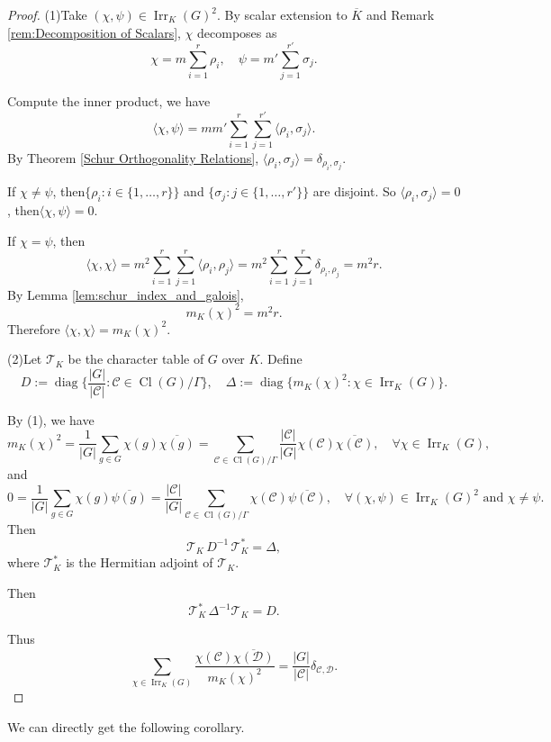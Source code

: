 \begin{proof}
(1)Take \((\chi,\psi) \in \operatorname{Irr}_K(G)^2\). By scalar extension to \(\overline K\) and Remark \ref{rem:Decomposition of Scalars}, \(\chi\) decomposes as
\[
\chi = m \sum_{i=1}^r \rho_i,\quad \psi = m' \sum_{j=1}^{r'} \sigma_j.
\]

Compute the inner product, we have
\[
\langle \chi, \psi \rangle
= m m' \sum_{i=1}^r \sum_{j=1}^{r'} \langle \rho_i, \sigma_j \rangle.
\]
By Theorem \ref{Schur Orthogonality Relations}, \(\langle \rho_i, \sigma_j \rangle = \delta_{\rho_i, \sigma_j}\).

If \(\chi \neq \psi\), then$\{\rho_i:i\in\{1,\dots,r\}\}$ and $\{\sigma_j:j\in\{1,\dots,r'\}\}$ are disjoint. So $\langle \rho_i, \sigma_j \rangle=0$ , then\(\langle \chi, \psi \rangle = 0\).

If \(\chi = \psi\), then 
\[
\langle \chi, \chi \rangle =m^2\sum_{i=1}^r \sum_{j=1}^{r} \langle \rho_i, \rho_j \rangle =m^2\sum_{i=1}^r \sum_{j=1}^r \delta_{\rho_i, \rho_j}=m^2 r.
\]
By Lemma \ref{lem:schur_index_and_galois},
\[
m_K(\chi)^2 = m^2 r.
\]
Therefore \(\langle \chi, \chi \rangle = m_K(\chi)^2\). 

(2)Let \(\mathcal T_K\) be the character table of $G$ over $K$. Define\[D:=\operatorname{diag}\{\frac{|G|}{|\mathcal{C}|}:\mathcal C\in \operatorname{Cl}(G)/\Gamma \},\quad \Delta:=\operatorname{diag}\{m_K(\chi)^2:\chi\in\operatorname{Irr}_K(G)\}.\]


By (1), we have
\[
m_K(\chi)^2=\frac{1}{|G|}\sum_{g\in G}\chi(g)\overline{\chi(g)}=\sum_{\mathcal C\in \operatorname{Cl}(G)/\Gamma}\frac{|\mathcal{C}|}{|G|}\chi(\mathcal{C})\overline{\chi(\mathcal{C})},\quad\forall \chi \in\operatorname{Irr}_K(G),    
\]and \[0=\frac{1}{|G|}\sum_{g\in G}\chi(g)\overline{\psi(g)}=\frac{|\mathcal{C}|}{|G|}\sum_{\mathcal C\in \operatorname{Cl}(G)/\Gamma}\chi(\mathcal{C})\overline{\psi(\mathcal{C})},\quad\forall (\chi,\psi) \in\operatorname{Irr}_K(G)^2 \text{ and } \chi\neq\psi.\]Then
\[
\mathcal T_K  \, D^{-1}\,\mathcal T_K^* =\Delta,
\]
where $\mathcal{T}_K^*$ is the Hermitian adjoint of $\mathcal{T}_K$.

Then\[\mathcal{T}_K^*\,\Delta^{-1}\mathcal T_K=D.\]

Thus
\[
\sum_{\chi \in \operatorname{Irr}_K(G)}
\frac{\chi(\mathcal C) \overline{\chi(\mathcal D)}}{m_K(\chi)^2}
=
\frac{|G|}{|\mathcal C|} \delta_{\mathcal C,\mathcal D}.
\]

\end{proof}
We can directly get the following corollary.

